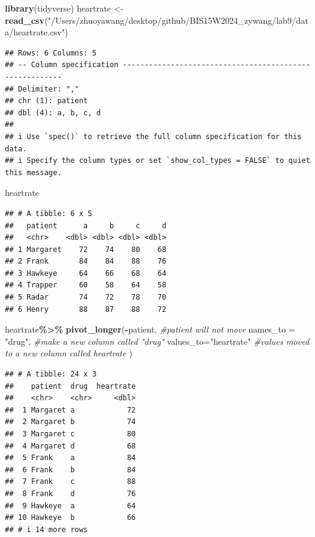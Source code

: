 \documentclass[
]{article}
\newenvironment{Shaded}{\begin{snugshade}}{\end{snugshade}}
\newcommand{\AttributeTok}[1]{\textcolor[rgb]{0.13,0.29,0.53}{#1}}
\newcommand{\CommentTok}[1]{\textcolor[rgb]{0.56,0.35,0.01}{\textit{#1}}}
\newcommand{\FunctionTok}[1]{\textcolor[rgb]{0.13,0.29,0.53}{\textbf{#1}}}
\newcommand{\NormalTok}[1]{#1}
\newcommand{\OtherTok}[1]{\textcolor[rgb]{0.56,0.35,0.01}{#1}}
\newcommand{\SpecialCharTok}[1]{\textcolor[rgb]{0.81,0.36,0.00}{\textbf{#1}}}
\newcommand{\StringTok}[1]{\textcolor[rgb]{0.31,0.60,0.02}{#1}}
\begin{document}
\begin{Shaded}
\begin{Highlighting}[]
\FunctionTok{library}\NormalTok{(tidyverse)}
\NormalTok{heartrate }\OtherTok{\textless{}{-}} \FunctionTok{read\_csv}\NormalTok{(}\StringTok{"/Users/zhuoyawang/desktop/github/BIS15W2024\_zywang/lab9/data/heartrate.csv"}\NormalTok{)}
\end{Highlighting}
\end{Shaded}

\begin{verbatim}
## Rows: 6 Columns: 5
## -- Column specification --------------------------------------------------------
## Delimiter: ","
## chr (1): patient
## dbl (4): a, b, c, d
## 
## i Use `spec()` to retrieve the full column specification for this data.
## i Specify the column types or set `show_col_types = FALSE` to quiet this message.
\end{verbatim}

\begin{Shaded}
\begin{Highlighting}[]
\NormalTok{heartrate}
\end{Highlighting}
\end{Shaded}

\begin{verbatim}
## # A tibble: 6 x 5
##   patient      a     b     c     d
##   <chr>    <dbl> <dbl> <dbl> <dbl>
## 1 Margaret    72    74    80    68
## 2 Frank       84    84    88    76
## 3 Hawkeye     64    66    68    64
## 4 Trapper     60    58    64    58
## 5 Radar       74    72    78    70
## 6 Henry       88    87    88    72
\end{verbatim}

\begin{Shaded}
\begin{Highlighting}[]
\NormalTok{heartrate}\SpecialCharTok{\%\textgreater{}\%} 
  \FunctionTok{pivot\_longer}\NormalTok{(}\SpecialCharTok{{-}}\NormalTok{patient, }\CommentTok{\#patient will not move}
               \AttributeTok{names\_to =} \StringTok{"drug"}\NormalTok{, }\CommentTok{\#make a new column called "drug"}
               \AttributeTok{values\_to=}\StringTok{"heartrate"} \CommentTok{\#values moved to a new column called heartrate}
\NormalTok{               )}
\end{Highlighting}
\end{Shaded}

\begin{verbatim}
## # A tibble: 24 x 3
##    patient  drug  heartrate
##    <chr>    <chr>     <dbl>
##  1 Margaret a            72
##  2 Margaret b            74
##  3 Margaret c            80
##  4 Margaret d            68
##  5 Frank    a            84
##  6 Frank    b            84
##  7 Frank    c            88
##  8 Frank    d            76
##  9 Hawkeye  a            64
## 10 Hawkeye  b            66
## # i 14 more rows
\end{verbatim}
\end{document}
